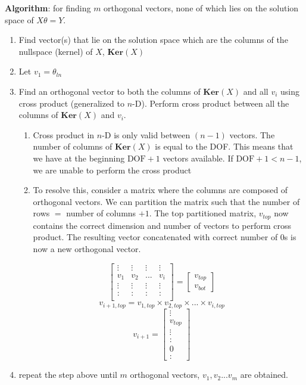 \documentclass{article}
\begin{document}
\textbf{Algorithm}: for finding $m$ orthogonal vectors, none of which lies on the solution space of $X\theta = Y$.
\begin{enumerate}
  \item Find vector(s) that lie on the solution space which are the columns of the nullspace (kernel) of $X$, $\textbf{Ker}(X)$
  \item Let $v_1 = \theta_{ln}$
  \item Find an orthogonal vector to both the columns of $\textbf{Ker}(X)$ and all $v_i$ using cross product (generalized to $n$-D). Perform cross product between all the columns of $\textbf{Ker}(X)$ and $v_{i}$.
  \begin{enumerate}
     \item Cross product in $n$-D is only valid between $(n-1)$ vectors. The number of columns of $\textbf{Ker}(X)$ is equal to the DOF. This means that we have at the beginning $\text{DOF} + 1$ vectors available. If $\text{DOF} + 1 < n - 1$, we are unable to perform the cross product 
     \item To resolve this, consider a matrix where the columns are composed of orthogonal vectors. We can partition the matrix such that the number of rows $=$ number of columns $+ 1$. The top partitioned matrix, $v_{top}$ now contains the correct dimension and number of vectors to perform cross product. The resulting vector concatenated with correct number of $0$s is now a new orthogonal vector.
  \end{enumerate}
    \[
        \left[ 
        \begin{array}{cccc} 
         \vdots & \vdots & \vdots & \vdots\\
         v_1 & v_2 & ... & v_i\\
         \vdots & \vdots & \vdots & \vdots\\
         \hline 
         : & : & : & : \\
        \end{array}
        \right] 
    =
        \left[ 
        \begin{array}{c} 
          v_{top}\\ 
          \hline 
          v_{bot} 
        \end{array} 
        \right] 
    \]
    \[
    v_{i+1, top} = v_{1, top} \times v_{2, top} \times ... \times v_{i, top}
    \]
    \[
    v_{i+1} = 
        \left[ 
        \begin{array}{c} 
          \vdots \\
          v_{top}\\ 
          \vdots \\
          \hline
          :\\
          0\\
          : 
        \end{array} 
        \right] 
    \]
  \item repeat the step above until $m$ orthogonal vectors, $v_1, v_2 ... v_m$ are obtained.
\end{enumerate}
\end{document}
